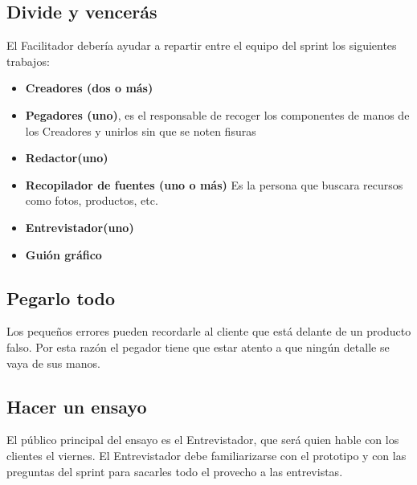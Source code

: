 \documentclass[10pt]{article}
\begin{document}
\begin{multicols}{2}
\subsection*{Divide y vencerás}
El Facilitador debería ayudar a repartir entre el equipo del sprint los siguientes trabajos:
\begin{itemize}
\item \textbf{Creadores (dos o más)}
\item \textbf{Pegadores (uno)}, es el responsable de recoger los componentes de manos de los Creadores y unirlos sin que se noten fisuras
\item \textbf{Redactor(uno)}
\item \textbf{Recopilador de fuentes (uno o más)} Es la persona que buscara recursos como fotos, productos, etc.
\item \textbf{Entrevistador(uno)}
\item \textbf{Guión gráfico} 
\end{itemize}
\subsection*{Pegarlo todo}
Los pequeños errores pueden recordarle al cliente que está delante de un producto falso. Por esta razón el pegador tiene que estar atento a que ningún detalle se vaya de sus manos.
\subsection*{Hacer un ensayo}
El público principal del ensayo es el Entrevistador, que será quien hable con los clientes el viernes. El Entrevistador debe familiarizarse con el prototipo y con las preguntas del sprint para sacarles todo el provecho a las entrevistas.
\end{multicols}
\end{document}
